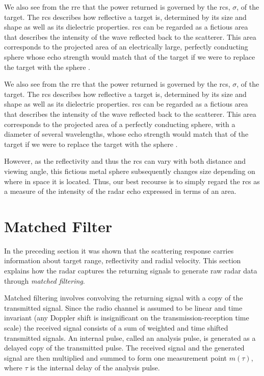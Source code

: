 We also see from the \gls{rre} that the power returned is governed by the \gls{rcs}, $\sigma$, of the target. The \gls{rcs} describes how reflective a target is, determined by its size and shape as well as its dielectric properties. \gls{rcs} can be regarded as a fictious area that describes the intensity of the wave reflected back to the scatterer. This area corresponds to the projected area of an electrically large, perfectly conducting sphere whose echo strength would match that of the target if we were to replace the target with the sphere \citep{knott_1993}. 

We also see from the \gls{rre} that the power returned is governed by the \gls{rcs}, $\sigma$, of the target. The \gls{rcs} describes how reflective a target is, determined by its size and shape as well as its dielectric properties. \gls{rcs} can be regarded as a fictious area that describes the intensity of the wave reflected back to the scatterer. This area corresponds to the projected area of a perfectly conducting sphere, with a diameter of several wavelengths, whose echo strength would match that of the target if we were to replace the target with the sphere \citep{knott_1993}. 

However, as the reflectivity and thus the \gls{rcs} can vary with both distance and viewing angle, this fictious metal sphere subsequently changes size depending on where in space it is located. Thus, our best recourse is to simply regard the \gls{rcs} as a measure of the intensity of the radar echo expressed in terms of an area. 

\section{Matched Filter}\label{sec:mf}

In the preceding section it was shown that the scattering response carries information about target range, reflectivity and radial velocity. This section explains how the radar captures the returning signals to generate raw radar data through \emph{matched filtering}.

Matched filtering involves convolving the returning signal with a copy of the transmitted signal. Since the radio channel is assumed to be linear and time invariant (any Doppler shift is insignificant on the transmission-reception time scale) the received signal consists of a sum of weighted and time shifted transmitted signals. An internal pulse, called an analysis pulse, is generated as a delayed copy of the transmitted pulse. The received signal and the generated signal are then multiplied and summed to form one measurement point $m(\tau)$, where $\tau$ is the internal delay of the analysis pulse. 

